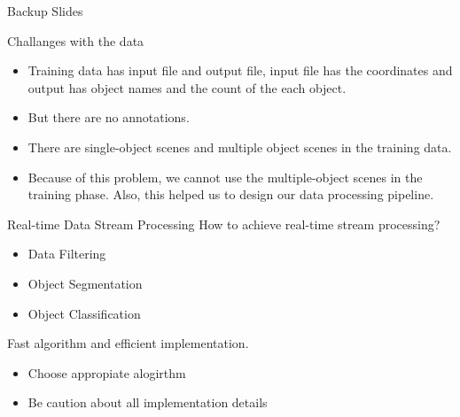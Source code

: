 \documentclass[9pt]{beamer}
\begin{document}

\appendix
\begin{frame}[fragile]{}

\centering
\Huge
Backup Slides

\end{frame}





\begin{frame}[fragile]{Challanges with the data}
	\begin{itemize}
		\item Training data has input file and output file, input file has the coordinates and output has object names and the count of the each object.
		\item But there are no annotations.
		\item There are single-object scenes and multiple object scenes in the training data.
		\item Because of this problem, we cannot use the multiple-object scenes in the training phase. Also, this helped us to design our data processing pipeline.
	\end{itemize}
\end{frame}


\begin{frame}[fragile]{Real-time Data Stream Processing}
How to achieve real-time stream processing? 
	
\begin{itemize}
	\item {} Data Filtering
	\item {} Object Segmentation
	\item {} Object Classification
\end{itemize}

Fast algorithm and efficient implementation. 

\begin{itemize}
	\item Choose appropiate alogirthm
	\item Be caution about all implementation details
\end{itemize}

\end{frame}
\end{document}
